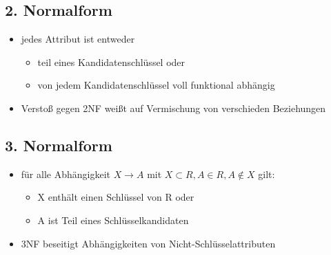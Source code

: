 \documentclass[a4paper]{article}
\begin{document}
\subsection{2. Normalform}
\begin{itemize}
    \item jedes Attribut ist entweder
    \begin{itemize}
        \item teil eines Kandidatenschlüssel oder
        \item von jedem Kandidatenschlüssel voll funktional abhängig
    \end{itemize}
    \item Verstoß gegen 2NF weißt auf Vermischung von verschieden Beziehungen 
\end{itemize}

\subsection{3. Normalform}
\begin{itemize}
    \item für alle Abhängigkeit $X \rightarrow A$ mit $X \subset R, A \in R, A \notin X$ gilt:
    \begin{itemize}
        \item X enthält einen Schlüssel von R oder
        \item A ist Teil eines Schlüsselkandidaten
    \end{itemize}
    \item 3NF beseitigt Abhängigkeiten von Nicht-Schlüsselattributen
\end{itemize}
\end{document}
